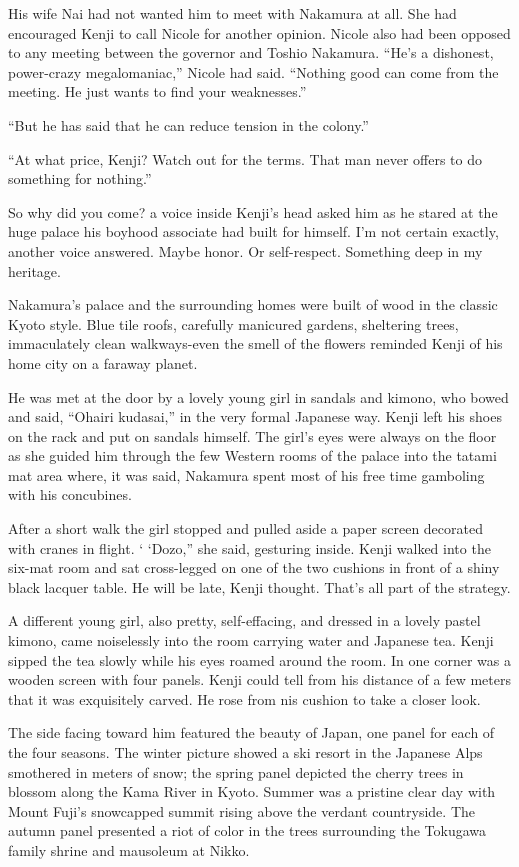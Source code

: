 \documentclass[]{article}
\begin{document}
{His wife Nai had not wanted him to meet with Nakamura at all. She had encouraged Kenji to call Nicole for another opinion. Nicole also had been opposed to any meeting between the governor and Toshio Nakamura. “He’s a dishonest, power-crazy megalomaniac,” Nicole had said. “Nothing good can come from the meeting. He just wants to find your weaknesses.”

“But he has said that he can reduce tension in the colony.”

“At what price, Kenji? Watch out for the terms. That man never offers to do something for nothing.”

So why did you come? a voice inside Kenji’s head asked him as he stared at the huge palace his boyhood associate had built for himself. I’m not certain exactly, another voice answered. Maybe honor. Or self-respect. Something deep in my heritage.

Nakamura’s palace and the surrounding homes were built of wood in the classic Kyoto style. Blue tile roofs, carefully manicured gardens, sheltering trees, immaculately clean walkways-even the smell of the flowers reminded Kenji of his home city on a faraway planet.

He was met at the door by a lovely young girl in sandals and kimono, who bowed and said, “Ohairi kudasai,” in the very formal Japanese way. Kenji left his shoes on the rack and put on sandals himself. The girl’s eyes were always on the floor as she guided him through the few Western rooms of the palace into the tatami mat area where, it was said, Nakamura spent most of his free time gamboling with his concubines.

After a short walk the girl stopped and pulled aside a paper screen decorated with cranes in flight. ‘ ‘Dozo,” she said, gesturing inside. Kenji walked into the six-mat room and sat cross-legged on one of the two cushions in front of a shiny black lacquer table. He will be late, Kenji thought. That’s all part of the strategy.

A different young girl, also pretty, self-effacing, and dressed in a lovely pastel kimono, came noiselessly into the room carrying water and Japanese tea. Kenji sipped the tea slowly while his eyes roamed around the room. In one corner was a wooden screen with four panels. Kenji could tell from his distance of a few meters that it was exquisitely carved. He rose from nis cushion to take a closer look.

The side facing toward him featured the beauty of Japan, one panel for each of the four seasons. The winter picture showed a ski resort in the Japanese Alps smothered in meters of snow; the spring panel depicted the cherry trees in blossom along the Kama River in Kyoto. Summer was a pristine clear day with Mount Fuji’s snowcapped summit rising above the verdant countryside. The autumn panel presented a riot of color in the trees surrounding the Tokugawa family shrine and mausoleum at Nikko.

}
\end{document}
